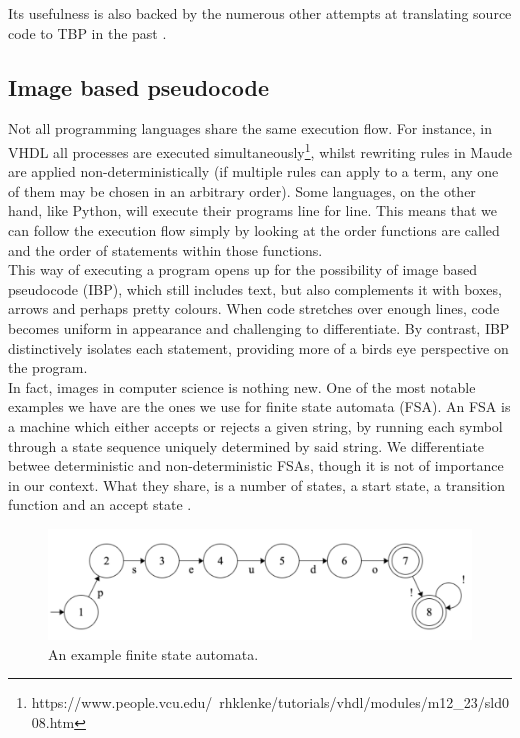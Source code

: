Its usefulness is also backed by the numerous other attempts at translating source code to TBP in the past \cite{PSEU:/Kreher/Stinson}\cite{DBLP:conf/aswec/AlhefdhiDHG18}.

\subsection{Image based pseudocode}

Not all programming languages share the same execution flow. For instance, in VHDL all processes are executed simultaneously\footnote{https://www.people.vcu.edu/~rhklenke/tutorials/vhdl/modules/m12\_23/sld008.htm}, whilst rewriting rules in Maude are applied non-deterministically (if multiple rules can apply to a term, any one of them may be chosen in an arbitrary order). Some languages, on the other hand, like Python, will execute their programs line for line. This means that we can follow the execution flow simply by looking at the order functions are called and the order of statements within those functions. \hfill \\

This way of executing a program opens up for the possibility of image based pseudocode (IBP), which still includes text, but also complements it with boxes, arrows and perhaps pretty colours. When code stretches over enough lines, code becomes uniform in appearance and challenging to differentiate. By contrast, IBP distinctively isolates each statement, providing more of a birds eye perspective on the program. \hfill \\

In fact, images in computer science is nothing new. One of the most notable examples we have are the ones we use for finite state automata (FSA). An FSA is a machine which either accepts or rejects a given string, by running each symbol through a state sequence uniquely determined by said string. We differentiate betwee deterministic and non-deterministic FSAs, though it is not of importance in our context. What they share, is a number of states, a start state, a transition function and an accept state \cite{introToAutomataTheory}. \hfill \\

\begin{figure}[ht]
    \centering
    \includegraphics[scale=0.46]{assets/dfa.png}
    \caption{An example finite state automata.}
    \label{fig:dfa}
\end{figure}

